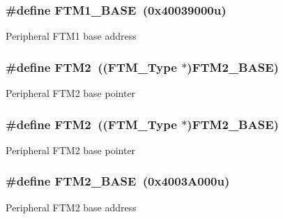 \subsubsection[{\texorpdfstring{F\+T\+M1\+\_\+\+B\+A\+SE}{FTM1_BASE}}]{\setlength{\rightskip}{0pt plus 5cm}\#define F\+T\+M1\+\_\+\+B\+A\+SE~(0x40039000u)}\hypertarget{group__FTM__Peripheral__Access__Layer_ga15ff8bad7e6945154dcffe5dc7404fd1}{}\label{group__FTM__Peripheral__Access__Layer_ga15ff8bad7e6945154dcffe5dc7404fd1}
Peripheral F\+T\+M1 base address 
\subsubsection[{\texorpdfstring{F\+T\+M2}{FTM2}}]{\setlength{\rightskip}{0pt plus 5cm}\#define F\+T\+M2~(({\bf F\+T\+M\+\_\+\+Type} $\ast$){\bf F\+T\+M2\+\_\+\+B\+A\+SE})}\hypertarget{group__FTM__Peripheral__Access__Layer_gad4b8561c440952d2f7b095e4a7399a18}{}\label{group__FTM__Peripheral__Access__Layer_gad4b8561c440952d2f7b095e4a7399a18}
Peripheral F\+T\+M2 base pointer 
\subsubsection[{\texorpdfstring{F\+T\+M2}{FTM2}}]{\setlength{\rightskip}{0pt plus 5cm}\#define F\+T\+M2~(({\bf F\+T\+M\+\_\+\+Type} $\ast$){\bf F\+T\+M2\+\_\+\+B\+A\+SE})}\hypertarget{group__FTM__Peripheral__Access__Layer_gad4b8561c440952d2f7b095e4a7399a18}{}\label{group__FTM__Peripheral__Access__Layer_gad4b8561c440952d2f7b095e4a7399a18}
Peripheral F\+T\+M2 base pointer 
\subsubsection[{\texorpdfstring{F\+T\+M2\+\_\+\+B\+A\+SE}{FTM2_BASE}}]{\setlength{\rightskip}{0pt plus 5cm}\#define F\+T\+M2\+\_\+\+B\+A\+SE~(0x4003\+A000u)}\hypertarget{group__FTM__Peripheral__Access__Layer_ga5f4976435e0a348f88929eaf23157bad}{}\label{group__FTM__Peripheral__Access__Layer_ga5f4976435e0a348f88929eaf23157bad}
Peripheral F\+T\+M2 base address 
